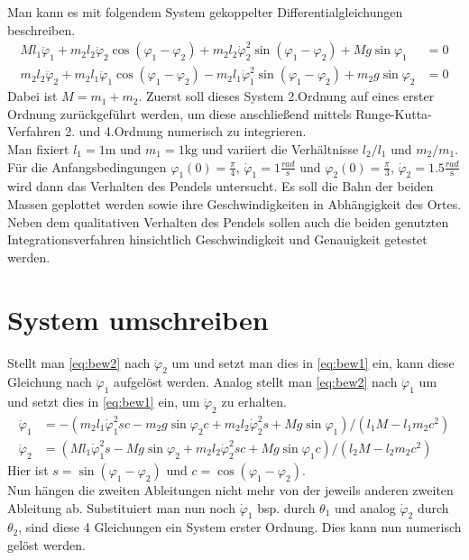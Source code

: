 \documentclass[12pt,a4paper,titlepage,headinclude,bibtotoc]{scrartcl}
\begin{document}
Man kann es mit folgendem System gekoppelter Differentialgleichungen beschreiben.
\begin{align}
	Ml_1\ddot{\varphi}_1 + m_2l_2\ddot{\varphi}_2\cos\left(\varphi_1-\varphi_2\right) + m_2l_2\dot{\varphi}_2^2\sin\left(\varphi_1-\varphi_2\right) + Mg\sin\varphi_1 &= 0 \label{eq:bew1} \\
	m_2l_2\ddot{\varphi}_2 + m_2l_1\ddot{\varphi}_1\cos\left(\varphi_1-\varphi_2\right) - m_2l_1\dot{\varphi}_1^2\sin\left(\varphi_1-\varphi_2\right) + m_2g\sin\varphi_2&=0 \label{eq:bew2}
\end{align}
Dabei ist $M=m_1+m_2$.
Zuerst soll dieses System 2.Ordnung auf eines erster Ordnung zurückgeführt werden, um diese anschließend mittels Runge-Kutta-Verfahren 2. und 4.Ordnung numerisch zu integrieren.\\
Man fixiert $l_1=1\si{\meter}$ und $m_1=1\si{\kilo\gram}$ und variiert die Verhältnisse $l_2/l_1$ und $m_2/m_1$.
Für die Anfangsbedingungen $\varphi_1(0)=\frac{\pi}{4}$, $\dot{\varphi}_1=1 \frac{\si{rad}}{\si{\second}}$ und $\varphi_2(0)=\frac{\pi}{3}$, $\dot{\varphi}_2=1.5 \frac{\si{rad}}{\si{\second}}$ wird dann das Verhalten des Pendels untersucht.
Es soll die Bahn der beiden Massen geplottet werden sowie ihre Geschwindigkeiten in Abhängigkeit des Ortes.
Neben dem qualitativen Verhalten des Pendels sollen auch die beiden genutzten Integrationsverfahren hinsichtlich Geschwindigkeit und Genauigkeit getestet werden.

\section{System umschreiben}
Stellt man \eqref{eq:bew2} nach $\ddot{\varphi}_2$ um und setzt man dies in \eqref{eq:bew1} ein, kann diese Gleichung nach $\ddot{\varphi}_1$ aufgelöst werden. Analog stellt man \eqref{eq:bew2} nach $\ddot{\varphi}_1$ um und setzt dies in \eqref{eq:bew1} ein, um $\ddot{\varphi}_2$ zu erhalten. 
\begin{align}
	\ddot{\varphi}_1 &= -\left(m_2l_1\dot{\varphi}_1^2sc - m_2g\sin\varphi_2c + m_2l_2\dot{\varphi}_2^2s+Mg\sin\varphi_1 \right)/ \left(l_1M-l_1m_2c^2\right)\\
	\ddot{\varphi}_2 &= \left(Ml_1\dot{\varphi}_1^2s - Mg\sin\varphi_2 + m_2l_2\dot{\varphi}_2^2sc+Mg\sin\varphi_1c \right)/ \left(l_2M-l_2m_2c^2\right)
\end{align}
Hier ist $s=\sin\left(\varphi_1-\varphi_2\right)$ und $c=\cos\left(\varphi_1-\varphi_2\right)$.\\
Nun hängen die zweiten Ableitungen nicht mehr von der jeweils anderen zweiten Ableitung ab.
Substituiert man nun noch $\dot{\varphi}_1$ bsp. durch $\theta_1$ und analog $\dot{\varphi}_2$ durch $\theta_2$, sind diese 4 Gleichungen ein System erster Ordnung.
Dies kann nun numerisch gelöst werden. 
\end{document}
